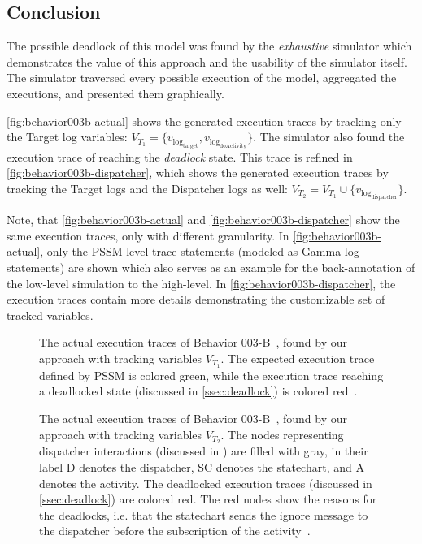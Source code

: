 \subsection{Conclusion}

The possible deadlock of this model was found by the \textit{exhaustive} simulator which demonstrates the value of this approach and the usability of the simulator itself. The simulator traversed every possible execution of the model, aggregated the executions, and presented them graphically.

\autoref{fig:behavior003b-actual} shows the generated execution traces by tracking only the Target log variables: $V_{T_1} = \{ v_{\mathrm{log_{target}}}, v_{\mathrm{log_{doActivity}}} \}$. The simulator also found the execution trace of reaching the \emph{deadlock} state. This trace is refined in \autoref{fig:behavior003b-dispatcher}, which shows the generated execution traces by tracking the Target logs and the Dispatcher logs as well: $V_{T_2} = V_{T_1} \cup \{ v_{\mathrm{log_{dispatcher}}} \}$.

Note, that \autoref{fig:behavior003b-actual} and \autoref{fig:behavior003b-dispatcher} show the same execution traces, only with different granularity. In \autoref{fig:behavior003b-actual}, only the PSSM-level trace statements (modeled as Gamma log statements) are shown which also serves as an example for the back-annotation of the low-level simulation to the high-level. In \autoref{fig:behavior003b-dispatcher}, the execution traces contain more details demonstrating the customizable set of tracked variables.

\begin{figure}
\centering

\caption{The actual execution traces of Behavior 003-B~\cite{pssm}, found by our approach with tracking variables $V_{T_1}$. The expected execution trace defined by PSSM is colored green, while the execution trace reaching a deadlocked state (discussed in \autoref{ssec:deadlock}) is colored red~\cite{tdk}.}
\label{fig:behavior003b-actual}
\end{figure}

\begin{figure}
\centering

\caption{The actual execution traces of Behavior 003-B~\cite{pssm}, found by our approach with tracking variables $V_{T_2}$. The nodes representing dispatcher interactions (discussed in \cite{tdk}) are filled with gray, in their label D denotes the dispatcher, SC denotes the statechart, and A denotes the activity. The deadlocked execution traces (discussed in \autoref{ssec:deadlock}) are colored red. The red nodes show the reasons for the deadlocks, i.e. that the statechart sends the ignore message to the dispatcher before the subscription of the activity~\cite{tdk}.}
\label{fig:behavior003b-dispatcher}
\end{figure}

